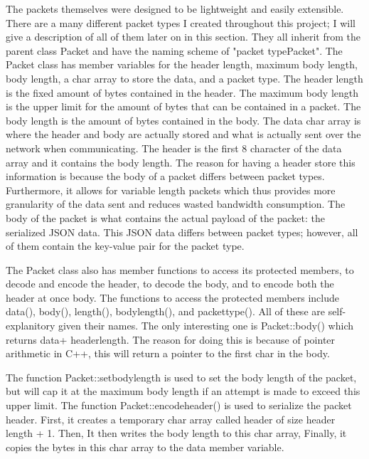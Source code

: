 \documentclass[conference]{IEEEtran}
\begin{document}
The packets themselves were designed to be lightweight and easily extensible.
There are a many different packet types I created throughout this project; I will give a description of all of them later on in this section.
They all inherit from the parent class Packet and have the naming scheme of "\textlangle packet type\textrangle Packet".
The Packet class has member variables for the header length, maximum body length, body length, a char array to store the data, and a packet type.
The header length is the fixed amount of bytes contained in the header.
The maximum body length is the upper limit for the amount of bytes that can be contained in  a packet.
The body length is the amount of bytes contained in the body.
The data char array is where the header and body are actually stored and what is actually sent over the network when communicating.
The header is the first 8 character of the data array and it contains the body length.
The reason for having a header store this information is because the body of a packet differs between packet types.
Furthermore, it allows for variable length packets which thus provides more granularity of the data sent and reduces wasted bandwidth consumption.
The body of the packet is what contains the actual payload of the packet: the serialized JSON data.
This JSON data differs between packet types; however, all of them contain the key-value pair for the packet type.

The Packet class also has member functions to access its protected members, to decode and encode the header, to decode the body, and to encode both the header at once body.
The functions to access the protected members include data(), body(), length(), body\textunderscore length(), and packet\textunderscore type().
All of these are self-explanitory given their names.
The only interesting one is Packet::body() which returns data\textunderscore + header\textunderscore length.
The reason for doing this is because of pointer arithmetic in C++, this will return a pointer to the first char in the body.

The function Packet::set\textunderscore body\textunderscore length is used to set the body length of the packet, but will cap it at the maximum body length if an attempt is made to exceed this upper limit.
The function Packet::encode\textunderscore header() is used to serialize the packet header.
First, it creates a temporary char array called header of size header length + 1.
Then, It then writes the body length to this char array,
Finally, it copies the bytes in this char array to the data member variable.
\end{document}
